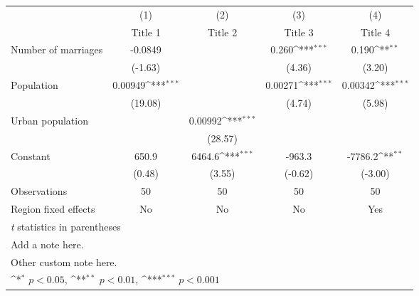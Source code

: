 {
\def\sym#1{\ifmmode^{#1}\else\(^{#1}\)\fi}
\begin{tabular}{l*{4}{c}}
\hline\hline
                    &\multicolumn{1}{c}{(1)}&\multicolumn{1}{c}{(2)}&\multicolumn{1}{c}{(3)}&\multicolumn{1}{c}{(4)}\\
                    &\multicolumn{1}{c}{Title 1}&\multicolumn{1}{c}{Title 2}&\multicolumn{1}{c}{Title 3}&\multicolumn{1}{c}{Title 4}\\
\hline
Number of marriages &     -0.0849         &                     &       0.260\sym{***}&       0.190\sym{**} \\
                    &     (-1.63)         &                     &      (4.36)         &      (3.20)         \\
[1em]
Population          &     0.00949\sym{***}&                     &     0.00271\sym{***}&     0.00342\sym{***}\\
                    &     (19.08)         &                     &      (4.74)         &      (5.98)         \\
[1em]
Urban population    &                     &     0.00992\sym{***}&                     &                     \\
                    &                     &     (28.57)         &                     &                     \\
[1em]
Constant            &       650.9         &      6464.6\sym{***}&      -963.3         &     -7786.2\sym{**} \\
                    &      (0.48)         &      (3.55)         &     (-0.62)         &     (-3.00)         \\
\hline
Observations        &          50         &          50         &          50         &          50         \\
Region fixed effects&          No         &          No         &          No         &         Yes         \\
\hline\hline
\multicolumn{5}{l}{\footnotesize \textit{t} statistics in parentheses}\\
\multicolumn{5}{l}{\footnotesize Add a note here.}\\
\multicolumn{5}{l}{\footnotesize Other custom note here.}\\
\multicolumn{5}{l}{\footnotesize \sym{*} \(p<0.05\), \sym{**} \(p<0.01\), \sym{***} \(p<0.001\)}\\
\end{tabular}
}
